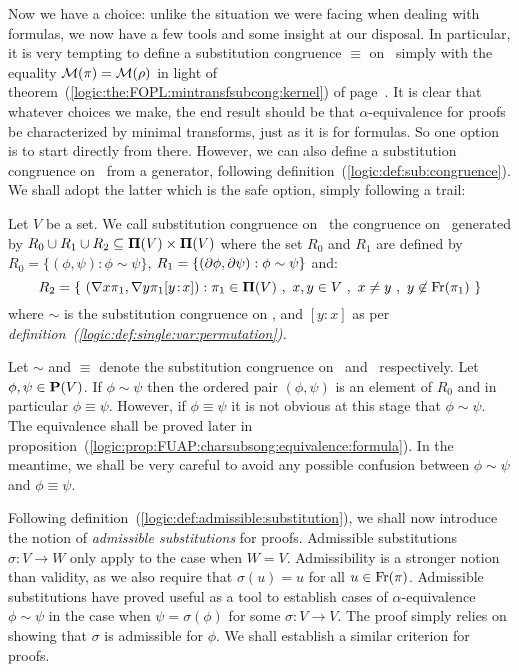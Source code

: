 Now we have a choice: unlike the situation we were facing when
dealing with formulas, we now have a few tools and some insight at
our disposal. In particular, it is very tempting to define a
substitution congruence $\equiv$ on \pvs\ simply with the equality
${\cal M}(\pi)={\cal M}(\rho)$ in light of
theorem~(\ref{logic:the:FOPL:mintransfsubcong:kernel}) of
page~\pageref{logic:the:FOPL:mintransfsubcong:kernel}. It is clear
that whatever choices we make, the end result should be that
$\alpha$-equivalence for proofs be characterized by minimal
transforms, just as it is for formulas. So one option is to start
directly from there. However, we can also define a substitution
congruence on \pvs\ from a generator, following
definition~(\ref{logic:def:sub:congruence}). We shall adopt the
latter which is the safe option, simply following a trail:

\begin{defin}\label{logic:def:FUAP:subcong:substitution:congruence}
Let $V$ be a set. We call substitution congruence on \pvs\ the
congruence on \pvs\ generated by $R_{0}\cup R_{1}\cup
R_{2}\subseteq\mbox{${\bf\Pi}(V)$}\times\mbox{${\bf\Pi}(V)$}$ where the set $R_{0}$ and $R_{1}$ are
defined by $R_{0}=\{(\phi,\psi):\phi\sim\psi\}$,
$R_{1}=\{(\mbox{$\partial$}\phi,\mbox{$\partial$}\psi):\phi\sim\psi\}$ and:
    \[
    R_{2}=\{\ (\mbox{$\nabla$} x\pi_{1},\mbox{$\nabla$} y\pi_{1}[y\!:\!x]):\pi_{1}\in\mbox{${\bf\Pi}(V)$}\ ,\ x,y\in V\
    ,\ x\neq y\ ,\ y\not\in\mbox{\rm Fr}(\pi_{1})\ \}
    \]
where $\sim$ is the substitution congruence on \pv, and $[y\!:\!x]$
as per {\em definition~(\ref{logic:def:single:var:permutation}).}
\end{defin}
Let $\sim$ and $\equiv$ denote the substitution congruence on \pv\
and \pvs\ respectively. Let $\phi,\psi\in\mbox{${\bf P}(V)$}$. If $\phi\sim\psi$
then the ordered pair $(\phi,\psi)$ is an element of $R_{0}$ and in
particular $\phi\equiv\psi$. However, if $\phi\equiv\psi$ it is not
obvious at this stage that $\phi\sim\psi$. The equivalence shall be
proved later in
proposition~(\ref{logic:prop:FUAP:charsubsong:equivalence:formula}).
In the meantime, we shall be very careful to avoid any possible
confusion between $\phi\sim\psi$ and $\phi\equiv\psi$.

Following definition~(\ref{logic:def:admissible:substitution}), we
shall now introduce the notion of {\em admissible substitutions} for
proofs. Admissible substitutions $\sigma:V\to W$ only apply to the
case when $W=V$. Admissibility is a stronger notion than validity,
as we also require that $\sigma(u)=u$ for all $u\in\mbox{\rm Fr}(\pi)$.
Admissible substitutions have proved useful as a tool to establish
cases of $\alpha$-equivalence $\phi\sim\psi$ in the case when
$\psi=\sigma(\phi)$ for some $\sigma:V\to V$. The proof simply
relies on showing that $\sigma$ is admissible for $\phi$. We shall
establish a similar criterion for proofs.


